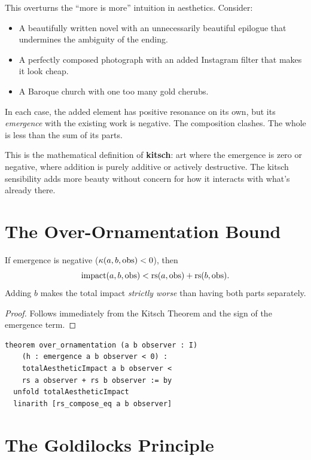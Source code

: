 \begin{remark}
This overturns the ``more is more'' intuition in aesthetics.  Consider:
\begin{itemize}
\item A beautifully written novel with an unnecessarily beautiful
  epilogue that undermines the ambiguity of the ending.
\item A perfectly composed photograph with an added Instagram filter
  that makes it look cheap.
\item A Baroque church with one too many gold cherubs.
\end{itemize}
In each case, the added element has positive resonance on its own, but
its \emph{emergence} with the existing work is negative.  The
composition clashes.  The whole is less than the sum of its parts.

This is the mathematical definition of \textbf{kitsch}: art where the
emergence is zero or negative, where addition is purely additive or
actively destructive.  The kitsch sensibility adds more beauty without
concern for how it interacts with what's already there.
\end{remark}

\section{The Over-Ornamentation Bound}

\begin{theorem}
\label{thm:over-ornament}
If emergence is negative ($\kappa(a, b, \mathrm{obs}) < 0$), then
\[
  \mathrm{impact}(a, b, \mathrm{obs}) < \mathrm{rs}(a, \mathrm{obs}) + \mathrm{rs}(b, \mathrm{obs}).
\]
Adding $b$ makes the total impact \emph{strictly worse} than having
both parts separately.
\end{theorem}

\begin{proof}
Follows immediately from the Kitsch Theorem and the sign of the
emergence term.
\end{proof}

\begin{lstlisting}
theorem over_ornamentation (a b observer : I)
    (h : emergence a b observer < 0) :
    totalAestheticImpact a b observer <
    rs a observer + rs b observer := by
  unfold totalAestheticImpact
  linarith [rs_compose_eq a b observer]
\end{lstlisting}

\section{The Goldilocks Principle}

